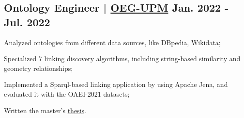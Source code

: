 \subsection{{Ontology Engineer | \href{https://oeg.fi.upm.es}{OEG-UPM} \hfill Jan. 2022 - Jul. 2022}}
\begin{zitemize}
    \item  Analyzed ontologies from different data sources, like DBpedia, Wikidata;
    \item  Specialized 7 linking discovery algorithms, including string-based similarity and geometry relationships;
    \item  Implemented a Sparql-based linking application by using Apache Jena, and evaluated it with the OAEI-2021 datasets;
    \item  Written the master's \href{https://oa.upm.es/71452/}{thesis}.
\end{zitemize}

